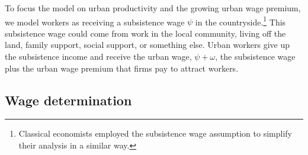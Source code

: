 




To focus the model on urban productivity and the growing urban wage premium, we model workers as receiving a \gls{subsistence wage} $\psi$ in the countryside.\footnote{Classical economists employed the \gls{subsistence wage} assumption to simplify their analysis in a similar way.} %
%
This subsistence wage could come from work in the local community, living off the land, family support, social support, or something else. 
Urban workers give up the subsistence income and receive the \gls{urban wage}, $\psi +  \omega$, the subsistence wage plus the \gls{urban wage premium} that firms pay to attract workers. 

\subsection{Wage determination}

